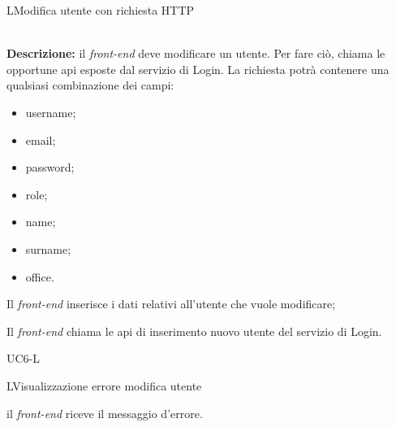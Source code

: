 \begin{usecase}{5}{L}{Modifica utente con richiesta HTTP}
	
	
	\textbf{\\Descrizione:} il \textit{front-end} deve modificare un utente. Per fare ciò,
	chiama le opportune \acrshort{api} esposte dal servizio di Login. La richiesta potrà contenere una qualsiasi combinazione dei campi:
	\begin{itemize}[noitemsep]
		\item username;
		\item email;
		\item password;
		\item role;
		\item name;
		\item surname;
		\item office.
	\end{itemize}

	\begin{ucscenarioprincipale}
		\item Il \textit{front-end} inserisce i dati relativi all'utente che vuole modificare;
		\item Il \textit{front-end} chiama le \acrshort{api} di inserimento nuovo utente del servizio di Login.
	\end{ucscenarioprincipale}


	\begin{ucestensioni}
		\item UC6-L
	\end{ucestensioni}
	
	\label{uc:richiesta-modifica-utente-l}
\end{usecase}

\begin{usecase}{6}{L}{Visualizzazione errore modifica utente}

	

	\begin{ucscenarioprincipale}
		\item il \textit{front-end} riceve il messaggio d'errore.
	\end{ucscenarioprincipale}


	\label{uc:vis-errore-modifica-utente-l}
\end{usecase}



